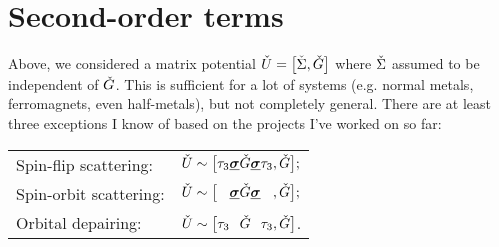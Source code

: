 \section{Second-order terms}
Above, we considered a matrix potential $\check{U} = \big[\check{\Sigma}, \check{G}\big]$ where $\check{\Sigma}$ assumed to be independent of $\check{G}$.
This is sufficient for a lot of systems (e.g. normal metals, ferromagnets, even half-metals), but not completely general.
There are at least three exceptions I know of based on the projects I've worked on so far:\\[1ex]
\begin{tabular}{ll}
  Spin-flip scattering: &
  $\check{U} \sim \big[ \tau_3 \underline{\bm{\sigma}} \check{G} \underline{\bm{\sigma}} \tau_3, \check{G} \big];$ \\[0.5ex]
  Spin-orbit scattering: &
  $\check{U} \sim \big[ \phantom{\tau_3}\underline{\bm{\sigma}} \check{G} \underline{\bm{\sigma}} \phantom{\tau_3}, \check{G} \big];$ \\[0.5ex]
  Orbital depairing: & 
  $\V{U} \sim \big[  \tau_3 \phantom{\BU{\sigma}}\V{G} \phantom{\BU{\sigma}} \tau_3 , \V{G} \big]$.\\[1ex]
\end{tabular}

